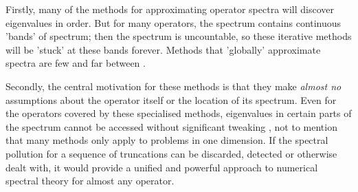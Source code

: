 \documentclass[../main.tex]{subfiles}
\begin{document}
Firstly, many of the methods for approximating operator spectra will discover eigenvalues
in order. But for many operators, the spectrum contains continuous 'bands' of spectrum;
then the spectrum is uncountable, so these iterative methods will be 'stuck' at these
bands forever. Methods that 'globally' approximate spectra are few and far between
\cite{pryce1993numerical}.

Secondly, the central motivation for these methods is that they make \emph{almost no}
assumptions about the operator itself or the location of its spectrum. Even for
the operators covered by these specialised methods, eigenvalues in certain parts
of the spectrum cannot be accessed without significant tweaking
\cite{aceto2006numerical}, not to mention that many methods only apply to
problems in one dimension. If the spectral pollution for a sequence of
truncations can be discarded, detected or otherwise dealt with, it would provide
a unified and powerful approach to numerical spectral theory for almost any operator.
\end{document}
